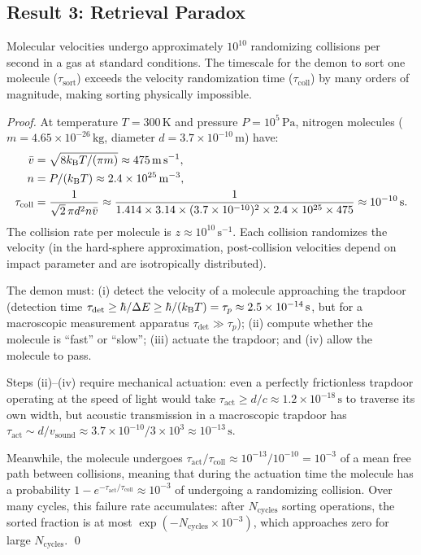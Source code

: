 \subsection{Result 3: Retrieval Paradox}

\begin{theorem}
\label{thm:retrieval_paradox}
Molecular velocities undergo approximately $10^{10}$ randomizing collisions per
second in a gas at standard conditions. The timescale for the demon to sort one
molecule ($\tau_{\mathrm{sort}}$) exceeds the velocity randomization time
($\tau_{\mathrm{coll}}$) by many orders of magnitude, making sorting physically
impossible.
\end{theorem}

\begin{proof}
At temperature $T = 300\,\mathrm{K}$ and pressure $P = 10^5\,\mathrm{Pa}$,
nitrogen molecules ($m = 4.65 \times 10^{-26}\,\mathrm{kg}$, diameter
$d = 3.7 \times 10^{-10}\,\mathrm{m}$) have:
\begin{align}
  \bar{v} &= \sqrt{8k_{\mathrm{B}} T / (\pi m)} \approx 475\,\mathrm{m\,s}^{-1}, \\
  n &= P / (k_{\mathrm{B}} T) \approx 2.4 \times 10^{25}\,\mathrm{m}^{-3}, \\
  \tau_{\mathrm{coll}} &= \frac{1}{\sqrt{2}\,\pi d^2 n \bar{v}}
       \approx \frac{1}{1.414 \times 3.14 \times (3.7\times10^{-10})^2
       \times 2.4\times10^{25} \times 475} \approx 10^{-10}\,\mathrm{s}.
\end{align}
The collision rate per molecule is $z \approx 10^{10}\,\mathrm{s}^{-1}$. Each
collision randomizes the velocity (in the hard-sphere approximation, post-collision
velocities depend on impact parameter and are isotropically distributed).

The demon must: (i) detect the velocity of a molecule approaching the trapdoor
(detection time $\tau_{\mathrm{det}} \geq \hbar / \Delta E \geq \hbar / (k_{\mathrm{B}} T)
= \tau_p \approx 2.5 \times 10^{-14}\,\mathrm{s}$, but for a macroscopic
measurement apparatus $\tau_{\mathrm{det}} \gg \tau_p$);
(ii) compute whether the molecule is ``fast'' or ``slow'';
(iii) actuate the trapdoor; and (iv) allow the molecule to pass.

Steps (ii)--(iv) require mechanical actuation: even a perfectly frictionless
trapdoor operating at the speed of light would take $\tau_{\mathrm{act}} \geq d/c
\approx 1.2 \times 10^{-18}\,\mathrm{s}$ to traverse its own width, but
acoustic transmission in a macroscopic trapdoor has $\tau_{\mathrm{act}} \sim d/v_{\mathrm{sound}}
\approx 3.7 \times 10^{-10} / 3 \times 10^3 \approx 10^{-13}\,\mathrm{s}$.

Meanwhile, the molecule undergoes $\tau_{\mathrm{act}} / \tau_{\mathrm{coll}}
\approx 10^{-13} / 10^{-10} = 10^{-3}$ of a mean free path between collisions,
meaning that during the actuation time the molecule has a probability
$1 - e^{-\tau_{\mathrm{act}}/\tau_{\mathrm{coll}}} \approx 10^{-3}$ of
undergoing a randomizing collision. Over many cycles, this failure rate
accumulates: after $N_{\mathrm{cycles}}$ sorting operations, the sorted fraction
is at most $\exp(-N_{\mathrm{cycles}} \times 10^{-3})$, which approaches zero
for large $N_{\mathrm{cycles}}$. \qed
\end{proof}

